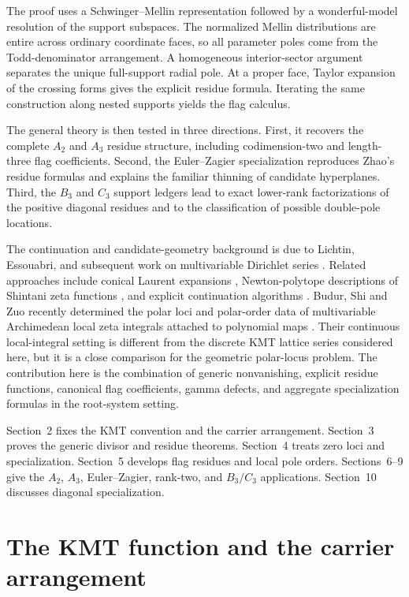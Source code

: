 \documentclass[11pt]{article}
\begin{document}
The proof uses a Schwinger--Mellin representation followed by a
wonderful-model resolution of the support subspaces.  The normalized
Mellin distributions are entire across ordinary coordinate faces, so
all parameter poles come from the Todd-denominator arrangement.  A
homogeneous interior-sector argument separates the unique
full-support radial pole.  At a proper face, Taylor expansion of the
crossing forms gives the explicit residue formula.  Iterating the same
construction along nested supports yields the flag calculus.

The general theory is then tested in three directions.  First, it
recovers the complete \(A_2\) and \(A_3\) residue structure, including
codimension-two and length-three flag coefficients.  Second, the
Euler--Zagier specialization reproduces Zhao's residue formulas and
explains the familiar thinning of candidate hyperplanes.  Third, the
\(B_3\) and \(C_3\) support ledgers lead to exact lower-rank
factorizations of the positive diagonal residues and to the
classification of possible double-pole locations.

The continuation and candidate-geometry background is due to
Lichtin, Essouabri, and subsequent work on multivariable Dirichlet
series \cite{Lichtin1988,Essouabri1997,BEL2007}.  Related approaches
include conical Laurent expansions \cite{GPZ2014,GPZ2020},
Newton-polytope descriptions of Shintani zeta functions
\cite{Lopez2022}, and explicit continuation algorithms
\cite{Rutard2023}.  Budur, Shi and Zuo recently determined the polar
loci and polar-order data of multivariable Archimedean local zeta
integrals attached to polynomial maps \cite{BudurShiZuo2025}.  Their
continuous local-integral setting is different from the discrete KMT
lattice series considered here, but it is a close comparison for the
geometric polar-locus problem.  The contribution here is the
combination of generic nonvanishing, explicit residue functions,
canonical flag coefficients, gamma defects, and aggregate
specialization formulas in the root-system setting.

Section~2 fixes the KMT convention and the carrier arrangement.
Section~3 proves the generic divisor and residue theorems.
Section~4 treats zero loci and specialization.  Section~5 develops
flag residues and local pole orders.  Sections~6--9 give the
\(A_2\), \(A_3\), Euler--Zagier, rank-two, and \(B_3/C_3\)
applications.  Section~10 discusses diagonal specialization.
\section{The KMT function and the carrier arrangement}
\end{document}
